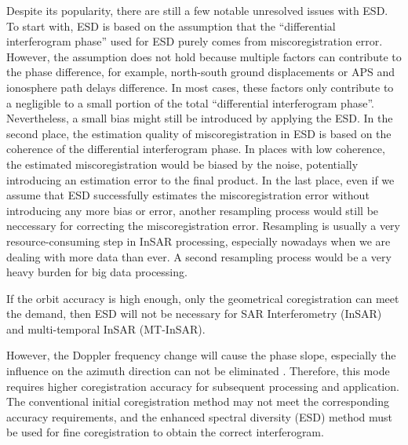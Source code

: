 \documentclass[preprint, authoryear]{elsarticle}
\begin{document}
Despite its popularity, there are still a few notable unresolved issues with ESD. To start with, ESD is based on the assumption that the ``differential interferogram phase'' used for ESD purely comes from miscoregistration error. However, the assumption does not hold because multiple factors can contribute to the phase difference, for example, north-south ground displacements or APS and ionosphere path delays difference. In most cases, these factors only contribute to a negligible to a small portion of the total ``differential interferogram phase''. Nevertheless, a small bias might still be introduced by applying the ESD. In the second place, the estimation quality of miscoregistration in ESD is based on the coherence of the differential interferogram phase. In places with low coherence, the estimated miscoregistration would be biased by the noise, potentially introducing an estimation error to the final product. In the last place, even if we assume that ESD successfully estimates the miscoregistration error without introducing any more bias or error, another resampling process would still be neccessary for correcting the miscoregistration error. Resampling is usually a very resource-consuming step in InSAR processing, especially nowadays when we are dealing with more data than ever. A second resampling process would be a very heavy burden for big data processing.






If the orbit accuracy is high enough, only the geometrical coregistration can meet the demand, then ESD will not be necessary for SAR Interferometry (InSAR) and multi-temporal InSAR (MT-InSAR). \par










However, the Doppler frequency change will cause the phase slope, especially the influence on the azimuth direction can not be eliminated \cite{A_Study_of_Sentinel-1_TOPS_Mode_Co-registration}. Therefore, this mode requires higher coregistration accuracy for subsequent processing and application. The conventional initial coregistration method may not meet the corresponding accuracy requirements, and the enhanced spectral diversity (ESD) method must be used for fine coregistration to obtain the correct interferogram. \par
\end{document}
